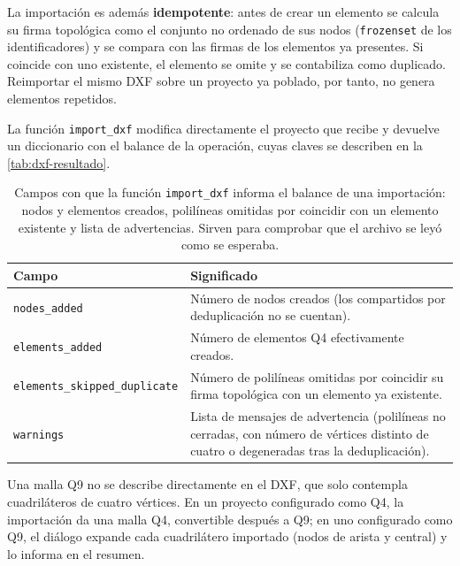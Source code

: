 La importación es además \textbf{idempotente}: antes de crear un elemento se calcula su firma topológica como el conjunto no ordenado de sus nodos (\texttt{frozenset} de los identificadores) y se compara con las firmas de los elementos ya presentes. Si coincide con uno existente, el elemento se omite y se contabiliza como duplicado. Reimportar el mismo DXF sobre un proyecto ya poblado, por tanto, no genera elementos repetidos.

La función \texttt{import\_dxf} modifica directamente el proyecto que recibe y devuelve un diccionario con el balance de la operación, cuyas claves se describen en la \autoref{tab:dxf-resultado}.

\begin{table}[htbp]
\centering
\caption[Campos del diccionario de resultado de \texttt{import\_dxf}.]{Campos con que la función \texttt{import\_dxf} informa el balance de una importación: nodos y elementos creados, polilíneas omitidas por coincidir con un elemento existente y lista de advertencias. Sirven para comprobar que el archivo se leyó como se esperaba.}
\label{tab:dxf-resultado}
\begin{tabular}{l p{8.4cm}}
\toprule
\textbf{Campo} & \textbf{Significado} \\
\midrule
\texttt{nodes\_added}                & Número de nodos creados (los compartidos por deduplicación no se cuentan). \\
\texttt{elements\_added}             & Número de elementos Q4 efectivamente creados. \\
\texttt{elements\_skipped\_duplicate} & Número de polilíneas omitidas por coincidir su firma topológica con un elemento ya existente. \\
\texttt{warnings}                    & Lista de mensajes de advertencia (polilíneas no cerradas, con número de vértices distinto de cuatro o degeneradas tras la deduplicación). \\
\bottomrule
\end{tabular}
\end{table}

Una malla Q9 no se describe directamente en el DXF, que solo contempla cuadriláteros de cuatro vértices. En un proyecto configurado como Q4, la importación da una malla Q4, convertible después a Q9; en uno configurado como Q9, el diálogo expande cada cuadrilátero importado (nodos de arista y central) y lo informa en el resumen.



